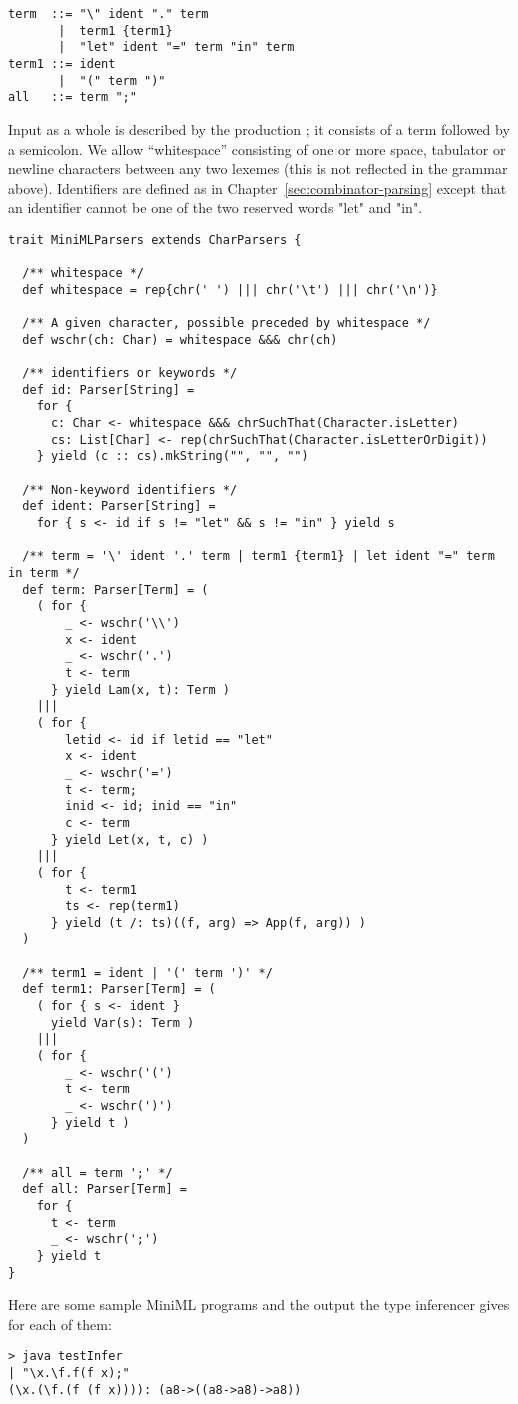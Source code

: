{{\begin{lstlisting}
term  ::= "\" ident "." term
       |  term1 {term1}
       |  "let" ident "=" term "in" term
term1 ::= ident
       |  "(" term ")"
all   ::= term ";"
\end{lstlisting}
Input as a whole is described by the production ; it
consists of a term followed by a semicolon. We allow ``whitespace''
consisting of one or more space, tabulator or newline characters
between any two lexemes (this is not reflected in the grammar
above). Identifiers are defined as in
Chapter~\ref{sec:combinator-parsing} except that an identifier cannot
be one of the two reserved words "let" and "in".
\begin{lstlisting}
trait MiniMLParsers extends CharParsers {

  /** whitespace */
  def whitespace = rep{chr(' ') ||| chr('\t') ||| chr('\n')}

  /** A given character, possible preceded by whitespace */
  def wschr(ch: Char) = whitespace &&& chr(ch)

  /** identifiers or keywords */
  def id: Parser[String] = 
    for {
      c: Char <- whitespace &&& chrSuchThat(Character.isLetter)
      cs: List[Char] <- rep(chrSuchThat(Character.isLetterOrDigit))
    } yield (c :: cs).mkString("", "", "")

  /** Non-keyword identifiers */
  def ident: Parser[String] =
    for { s <- id if s != "let" && s != "in" } yield s

  /** term = '\' ident '.' term | term1 {term1} | let ident "=" term in term */
  def term: Parser[Term] = (
    ( for {
        _ <- wschr('\\')
        x <- ident
        _ <- wschr('.')
        t <- term
      } yield Lam(x, t): Term )
    |||
    ( for {
        letid <- id if letid == "let"
        x <- ident
        _ <- wschr('=')
        t <- term; 
        inid <- id; inid == "in"
        c <- term
      } yield Let(x, t, c) )
    |||
    ( for {
        t <- term1
        ts <- rep(term1)
      } yield (t /: ts)((f, arg) => App(f, arg)) )
  )     

  /** term1 = ident | '(' term ')' */
  def term1: Parser[Term] = (
    ( for { s <- ident }
      yield Var(s): Term )
    |||
    ( for {
        _ <- wschr('(')
        t <- term
        _ <- wschr(')')
      } yield t )
  )

  /** all = term ';' */
  def all: Parser[Term] = 
    for {
      t <- term
      _ <- wschr(';')
    } yield t
}
\end{lstlisting}
Here are some sample MiniML programs and the output the type inferencer gives for each of them:
\begin{lstlisting}
> java testInfer
| "\x.\f.f(f x);"
(\x.(\f.(f (f x)))): (a8->((a8->a8)->a8))


\end{lstlisting}}}
